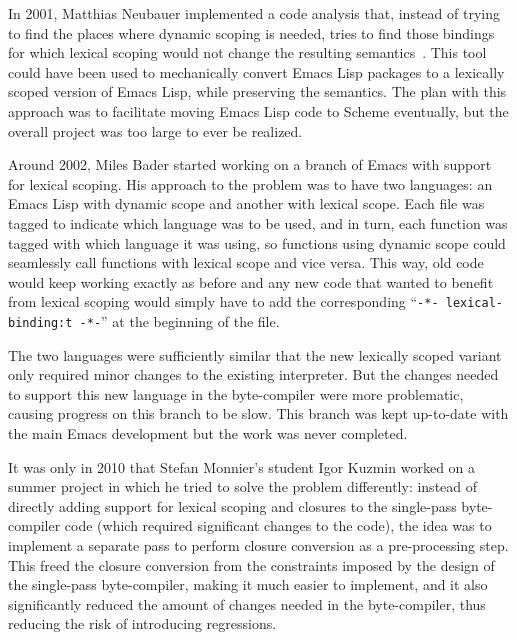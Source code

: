 \documentclass[format=acmsmall, review]{acmart}
\newcommand \Elisp {Emacs Lisp}
\begin{document}
In 2001, Matthias Neubauer implemented a code
analysis that, instead of trying to find the places where dynamic scoping is
needed, tries to find those bindings for which lexical scoping would not
change the resulting semantics~\cite{Neubauer01}.
This tool could have been used to
mechanically convert \Elisp{} packages to a lexically scoped version of
\Elisp{}, while preserving the semantics.  The plan with this approach
was to facilitate moving \Elisp{} code to Scheme eventually, but the
overall project was too large to ever be realized.

Around 2002, Miles Bader started working on a branch of Emacs with support
for lexical scoping.  His approach to the problem was to
have two languages: an \Elisp{} with dynamic scope and another with lexical
scope.  Each file was tagged to indicate which language was to be used, and
in turn, each function was tagged with which language it was using, so
functions using dynamic scope could seamlessly call functions with lexical
scope and vice versa.  This way, old code would keep working exactly as
before and any new code that wanted to benefit from lexical scoping would
simply have to add the corresponding ``\texttt{-*- lexical-binding:t -*-}''
at the beginning of the file.

The two languages were sufficiently similar that the new lexically scoped
variant only required minor changes to the existing interpreter.  But the
changes needed to support this new language in the byte-compiler were more
problematic, causing progress on this branch to be slow.
This branch was kept up-to-date with the main Emacs
development but the work was never completed.

It was only in 2010 that Stefan Monnier's student Igor Kuzmin
worked on a summer project in which he tried to solve the problem
differently: instead of directly adding support for lexical scoping and
closures to the single-pass byte-compiler code (which required significant
changes to the code), the idea was to implement a separate pass to perform
closure conversion as a pre-processing step.  This freed the closure
conversion from the constraints imposed by the design of the single-pass
byte-compiler, making it much easier to implement, and it also significantly
reduced the amount of changes needed in the byte-compiler, thus reducing the
risk of introducing regressions.
\end{document}
